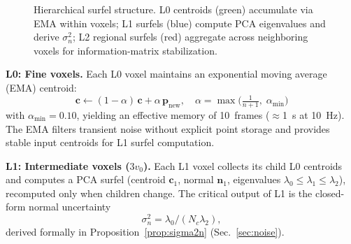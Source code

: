 \documentclass[conference]{IEEEtran}
\newcommand{\bvec}[1]{\mathbf{#1}}
\begin{document}
\begin{figure}[t]
  \caption{Hierarchical surfel structure. L0 centroids (green) accumulate
  via EMA within voxels; L1 surfels (blue) compute PCA eigenvalues and
  derive $\sigma^2_n$; L2 regional surfels (red) aggregate across
  neighboring voxels for information-matrix stabilization.}
  \label{fig:surfel_hierarchy}
\end{figure}

\textbf{L0: Fine voxels.}
Each L0 voxel maintains an exponential moving average (EMA) centroid:
\begin{equation}\label{eq:ema}
  \bvec{c} \leftarrow (1 - \alpha)\,\bvec{c} + \alpha\,\bvec{p}_\mathrm{new},
  \quad
  \alpha = \max\!\bigl(\tfrac{1}{n+1},\; \alpha_\mathrm{min}\bigr)
\end{equation}
with $\alpha_\mathrm{min} = 0.10$, yielding an effective memory of
10~frames ($\approx$\SI{1}{\second} at \SI{10}{\hertz}). The EMA
filters transient noise without explicit point storage and provides
stable input centroids for L1 surfel computation.

\textbf{L1: Intermediate voxels ($3v_0$).}
Each L1 voxel collects its child L0 centroids and computes a PCA
surfel (centroid $\bvec{c}_1$, normal $\bvec{n}_1$, eigenvalues
$\lambda_0\!\le\!\lambda_1\!\le\!\lambda_2$), recomputed only when
children change. The critical output of L1 is the closed-form normal
uncertainty
\begin{equation}\label{eq:normal_unc}
  \sigma^2_n = \lambda_0/(N_c\lambda_2),
\end{equation}
derived formally in Proposition~\ref{prop:sigma2n} (Sec.~\ref{sec:noise}).
\end{document}
